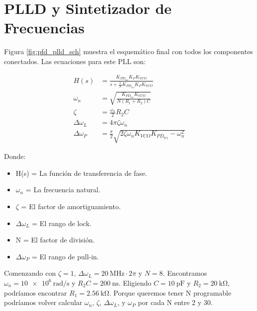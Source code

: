 \documentclass[a4paper]{article}
\begin{document}
\section{PLLD y Sintetizador de Frecuencias}

Figura \ref{fig:pfd_plld_sch} muestra el esquemático final con todos los componentes conectados. Las ecuaciones para este PLL son:

\begin{align*}
    H(s) &= \frac{K_{PD_{tri}} K_F K_{VCO}}{s + \frac{1}{N} K_{PD_{tri}} K_F K_{VCO}} \\
    \omega_n &= \sqrt{\frac{K_{PD_{tri}} K_{VCO}}{N(R_1 + R_2)C}} \\
    \zeta &= \frac{\omega_n}{2} R_2 C \\
    \Delta\omega_L &= 4\pi\zeta\omega_n \\
    \Delta\omega_P &= \frac{\pi}{2}\sqrt{2\zeta\omega_n K_{VCO} K_{PD_{tri}} - \omega_n^2}
\end{align*}

Donde:
\begin{itemize}[noitemsep]
    \item H(s) = La función de transferencia de fase.
    \item $\omega_n$ = La frecuencia natural.
    \item $\zeta$ = El factor de amortiguamiento.
    \item $\Delta\omega_L$ = El rango de lock.
    \item N = El factor de división.
    \item $\Delta\omega_P$ = El rango de pull-in.
\end{itemize}

Comenzando con $\zeta = 1$, $\Delta\omega_L = \SI{20}{\mega\hertz} \cdot 2\pi$ y $N = 8$. Encontramos $\omega_n = \SI[per-mode=symbol]{10e6}{\radian\per\second}$ y $R_2 C = \SI{200}{\nano\second}$. Eligiendo $C = \SI{10}{\pico\farad}$ y $R_2 = \SI{20}{\kilo\ohm}$, podríamos encontrar $R_1 = \SI{2.56}{\kilo\ohm}$. Porque queremos tener N programable podríamos volver calcular $\omega_n$, $\zeta$, $\Delta\omega_L$, y $\omega_P$ por cada N entre 2 y 30.
\end{document}
